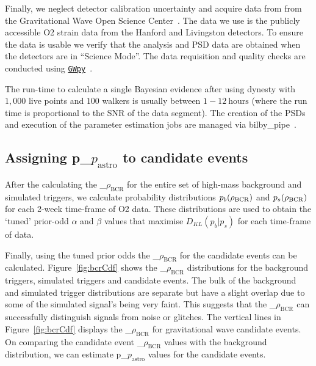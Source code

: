 \documentclass[%
 nofootinbib,
 amsmath,amssymb,
 aps,
 twocolumn
]{revtex4-2}
\newcommand{\bilbypipe}{{\sc bilby\_pipe}\xspace}
\newcommand{\dynesty}{{\sc dynesty}\xspace}
\newcommand{\gwpy}{{\sc \href{https://gwpy.github.io/}{\texttt{GWpy}}}\xspace}
\newcommand{\fancytext}[1]{{\relax\ifmmode#1\else $#1$\fi}\xspace}
\newcommand{\mathcmd}[1]{{\sc \relax\ifmmode#1\else $#1$\fi}\xspace}
\newcommand{\bcr}{\mathcmd{\rho_\text{BCR}}}
\newcommand{\pastro}{\fancytext{p_\text{astro}}}
\begin{document}
Finally, we neglect detector calibration uncertainty and acquire data from from the Gravitational Wave Open Science Center~\cite{GWOSC}. The data we use is the publicly accessible O2 strain data from the Hanford and Livingston detectors. To ensure the data is usable we verify that the analysis and PSD data are obtained when the detectors are  in ``Science Mode''. The data requisition and quality checks are conducted using \gwpy~\cite{gwpy}. 

The run-time to calculate a single Bayesian evidence after using \dynesty with $1,000$ live points and $100$ walkers is usually between $1-12\ \text{hours}$ (where the run time is proportional to the SNR of the data segment). The creation of the PSDs and execution of the parameter estimation jobs are managed via \bilbypipe~\cite{bilby_pipe}.

\subsection{Assigning \pastro to candidate events}

After the calculating the \bcr for the entire set of high-mass background and simulated triggers, we calculate probability distributions $p_b(\bcr)$ and $p_s(\bcr)$ for each 2-week time-frame of O2 data. These distributions are used to obtain the `tuned' prior-odd $\alpha$ and $\beta$ values that maximise $D_{KL}(p_b|p_s)$ for each time-frame of data.

Finally, using the tuned prior odds the \bcr for the candidate events can be calculated. Figure~\ref{fig:bcrCdf} shows the \bcr distributions for the background triggers, simulated triggers and candidate events. The bulk of the background and simulated trigger distributions are separate but have a slight overlap due to some of the simulated signal's being very faint. This suggests that the \bcr can successfully distinguish signals from noise or glitches. The vertical lines in Figure~\ref{fig:bcrCdf} displays the \bcr for gravitational wave candidate events. On comparing the candidate event \bcr values with the background distribution, we can estimate \pastro values for the candidate events. 
\end{document}
